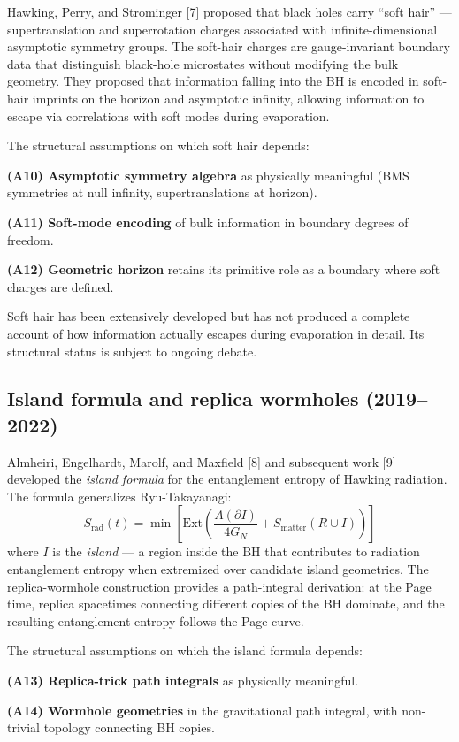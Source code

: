 \documentclass[11pt,a4paper]{article}
\begin{document}
Hawking, Perry, and Strominger [7] proposed that black holes carry ``soft hair'' --- supertranslation and superrotation charges associated with infinite-dimensional asymptotic symmetry groups. The soft-hair charges are gauge-invariant boundary data that distinguish black-hole microstates without modifying the bulk geometry. They proposed that information falling into the BH is encoded in soft-hair imprints on the horizon and asymptotic infinity, allowing information to escape via correlations with soft modes during evaporation.

The structural assumptions on which soft hair depends:

\textbf{(A10) Asymptotic symmetry algebra} as physically meaningful (BMS symmetries at null infinity, supertranslations at horizon).

\textbf{(A11) Soft-mode encoding} of bulk information in boundary degrees of freedom.

\textbf{(A12) Geometric horizon} retains its primitive role as a boundary where soft charges are defined.

Soft hair has been extensively developed but has not produced a complete account of how information actually escapes during evaporation in detail. Its structural status is subject to ongoing debate.

\subsection{Island formula and replica wormholes (2019--2022)}

Almheiri, Engelhardt, Marolf, and Maxfield [8] and subsequent work [9] developed the \emph{island formula} for the entanglement entropy of Hawking radiation. The formula generalizes Ryu-Takayanagi:
\[
S_{\mathrm{rad}}(t) = \min\left[ \mathrm{Ext}\left( \frac{A(\partial I)}{4 G_N} + S_{\mathrm{matter}}(R \cup I) \right) \right]
\]
where $I$ is the \emph{island} --- a region inside the BH that contributes to radiation entanglement entropy when extremized over candidate island geometries. The replica-wormhole construction provides a path-integral derivation: at the Page time, replica spacetimes connecting different copies of the BH dominate, and the resulting entanglement entropy follows the Page curve.

The structural assumptions on which the island formula depends:

\textbf{(A13) Replica-trick path integrals} as physically meaningful.

\textbf{(A14) Wormhole geometries} in the gravitational path integral, with non-trivial topology connecting BH copies.
\end{document}
